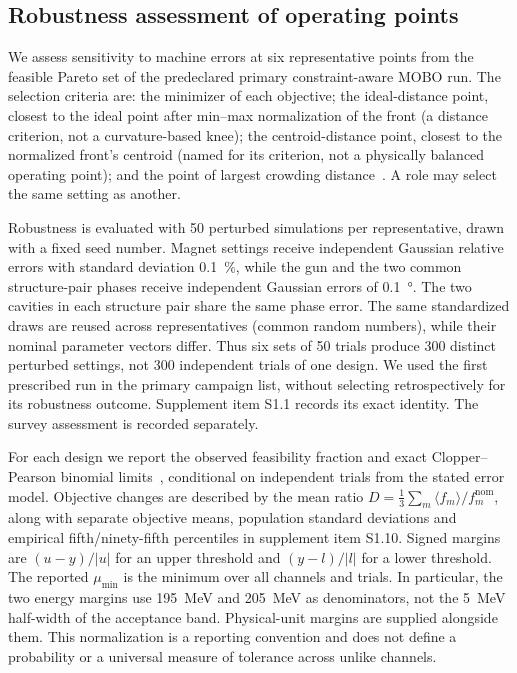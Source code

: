 \documentclass[aps,prab,reprint,superscriptaddress,amsmath,amssymb,floatfix]{revtex4-2}
\begin{document}
\subsection{Robustness assessment of operating points}
\label{sec:audit}
We assess sensitivity to machine errors at six representative points from the feasible Pareto
set of the predeclared primary constraint-aware MOBO run. The selection criteria are: the minimizer
of each objective;
the ideal-distance point, closest to the ideal point after min--max normalization of the front
(a distance criterion, not a curvature-based knee); the
centroid-distance point, closest to the normalized front's centroid (named for its criterion,
not a physically balanced operating point); and the point of largest crowding
distance~\cite{Deb2002}. A role may select the same setting as another.

Robustness is evaluated with 50 perturbed simulations per representative, drawn with a fixed
seed number. Magnet settings receive independent Gaussian relative errors with standard
deviation \SI{0.1}{\percent}, while the gun and the two common structure-pair phases receive
independent Gaussian errors of \SI{0.1}{\degree}. The two cavities in each structure pair share
the same phase error. The same standardized draws are reused across representatives (common
random numbers), while their nominal parameter vectors differ. Thus six sets of 50 trials
produce 300 distinct perturbed settings, not 300 independent trials of one design. We used the
first prescribed run in the primary campaign list, without selecting retrospectively for its
robustness outcome. Supplement item S1.1 records its exact identity. The survey assessment is
recorded separately.

For each design we report the observed feasibility fraction and exact Clopper--Pearson
binomial limits~\cite{Clopper1934}, conditional on independent trials from the stated error model. Objective
changes are described by the mean ratio
$D = \frac{1}{3}\sum_m \langle f_m\rangle/f_m^{\mathrm{nom}}$, along with separate
objective means, population standard deviations and empirical fifth/ninety-fifth percentiles
in supplement item S1.10. Signed margins are $(u-y)/|u|$ for an upper threshold and
$(y-l)/|l|$ for a lower threshold. The reported $\mu_{\min}$ is the minimum over all
channels and trials. In particular, the two energy margins use \SI{195}{\mega\electronvolt}
and \SI{205}{\mega\electronvolt} as denominators, not the \SI{5}{\mega\electronvolt}
half-width of the acceptance band. Physical-unit margins are supplied alongside them.
This normalization is a reporting convention and does not define a probability or a
universal measure of tolerance across unlike channels.
\end{document}
